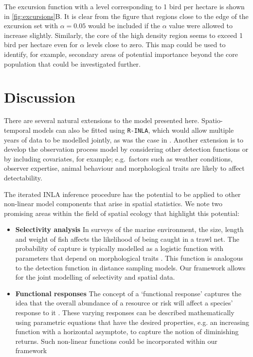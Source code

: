 \documentclass{statsoc}
\begin{document}
The excursion function with a level corresponding to 1 bird per hectare is shown in \autoref{fig:excursions}B.  It is clear from the figure that regions close to the edge of the excursion set with $\alpha = 0.05$ would be included if the $\alpha$ value were allowed to increase slightly.  Similarly, the core of the high density region seems to exceed 1 bird per hectare even for $\alpha$ levels close to zero. This map could be used to identify, for example, secondary areas of potential importance beyond the core population that could be investigated further.

\section{Discussion}
\label{sec-discussion}

There are several natural extensions to the model presented here.  Spatio-temporal models can also be fitted using \texttt{R-INLA}, which would allow multiple years of data to be modelled jointly, as was the case in \cite{camp_dsm_2020}.  Another extension is to develop the observation process model by considering other detection functions or by including covariates, for example; e.g.\ factors such as weather conditions, observer expertise, animal behaviour and morphological traits are likely to affect detectability.

The iterated INLA inference procedure has the potential to be applied to other non-linear model components that arise in spatial statistics.  We note two promising areas within the field of spatial ecology that highlight this potential:

\begin{itemize}
	\item \textbf{Selectivity analysis} In surveys of the marine environment, the size, length and weight of fish affects the likelihood of being caught in a trawl net.  The probability of capture is typically modelled as a logistic function with parameters that depend on morphological traits \citep{herrmann_understanding_2016, madsen_selectivity_2007, galbraith_demersal_1994}.  This function is analogous to the detection function in distance sampling models.  Our framework allows for the joint modelling of selectivity and spatial data.
	\item \textbf{Functional responses} The concept of a `functional response' captures the idea that the overall abundance of a resource or risk will affect a species' response to it \citep{holling_some_1959}.  These varying responses can be described mathematically using parametric equations that have the desired properties, e.g. an increasing function with a horizontal asymptote, to capture the notion of diminishing returns.  Such non-linear functions could be incorporated within our framework
\end{itemize}
\end{document}

